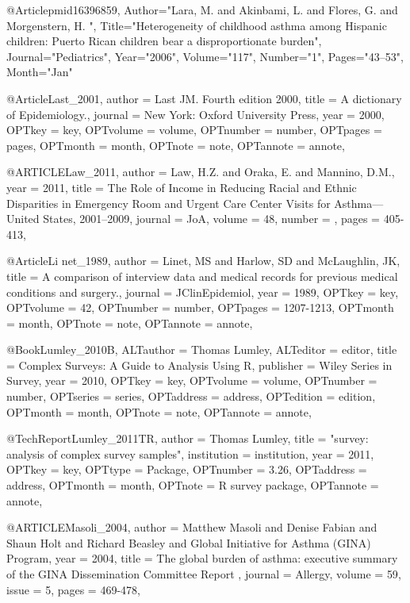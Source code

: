 {{{%
@Article{pmid16396859,
   Author="Lara, M.  and Akinbami, L.  and Flores, G.  and Morgenstern, H. ",
   Title="{{H}eterogeneity of childhood asthma among {H}ispanic children: {P}uerto {R}ican children bear a disproportionate burden}",
   Journal="Pediatrics",
   Year="2006",
   Volume="117",
   Number="1",
   Pages="43--53",
   Month="Jan"
}


@Article{Last_2001,
author = {Last JM. Fourth edition 2000},
title = {A dictionary of Epidemiology.},
journal = {New York: Oxford University Press},
year = {2000},
OPTkey = {key},
OPTvolume = {volume},
OPTnumber = {number},
OPTpages = {pages},
OPTmonth = {month},
OPTnote = {note},
OPTannote = {annote},
}

@ARTICLE{Law_2011,
  author = {Law, H.Z. and Oraka, E. and Mannino, D.M.},
  year = {2011},
  title = {The Role of Income in Reducing Racial and Ethnic Disparities in Emergency Room and Urgent Care Center Visits for Asthma—United States, 2001–2009},
  journal = JoA,
  volume =  {48},
  number = {},
  pages = {405-413},
}

@Article{Li
net_1989,
author = {Linet, MS and Harlow, SD and McLaughlin, JK},
title = {A comparison of interview data and medical records for previous medical conditions and surgery.},
journal = {JClinEpidemiol},
year = {1989},
OPTkey = {key},
OPTvolume = {42},
OPTnumber = {number},
OPTpages = {1207-1213},
OPTmonth = {month},
OPTnote = {note},
OPTannote = {annote},
}


@Book{Lumley_2010B,
ALTauthor = {Thomas Lumley},
ALTeditor = {editor},
title = {Complex Surveys: A Guide to Analysis Using R},
publisher = {Wiley Series in Survey},
year = {2010},
OPTkey = {key},
OPTvolume = {volume},
OPTnumber = {number},
OPTseries = {series},
OPTaddress = {address},
OPTedition = {edition},
OPTmonth = {month},
OPTnote = {note},
OPTannote = {annote},
}

@TechReport{Lumley_2011TR,
author = {Thomas Lumley},
title = {"survey: analysis of complex survey samples"},
institution = {institution},
year = {2011},
OPTkey = {key},
OPTtype = {Package},
OPTnumber = {3.26},
OPTaddress = {address},
OPTmonth = {month},
OPTnote = {R survey package},
OPTannote = {annote},
}


@ARTICLE{Masoli_2004,
  author = {Matthew Masoli and Denise Fabian and Shaun Holt and Richard Beasley and Global Initiative for Asthma (GINA) Program},
  year = {2004},
  title = {The global burden of asthma: executive summary of the GINA Dissemination Committee Report
  },
  journal = Allergy,
  volume =  {59},
  issue = {5},
  pages = {469-478},
}

}}}
